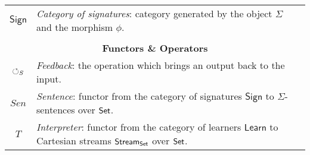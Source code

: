 \begin{table}[!t]
{\begin{tabularx}{\columnwidth}{cX}
\(\mathsf{Sign}\) & \textit{Category of signatures}: category generated by the object $\Sigma$ and the morphism $\phi$. \\
\\
\multicolumn{2}{c}{\textbf{Functors \& Operators}}  \\
$\fbk[S]$ & \textit{Feedback}: the operation which brings an output back to the input. \\
\(Sen\) & \textit{Sentence}: functor from the category of signatures $\mathsf{Sign}$ to $\Sigma$-sentences over $\Set$. \\
$T$ & \textit{Interpreter}: functor from the category of learners \(\mathsf{Learn}\) to Cartesian streams $\Stream{\Set}$ over $\Set$. \\
\bottomrule
\end{tabularx}%
}
\end{table}

